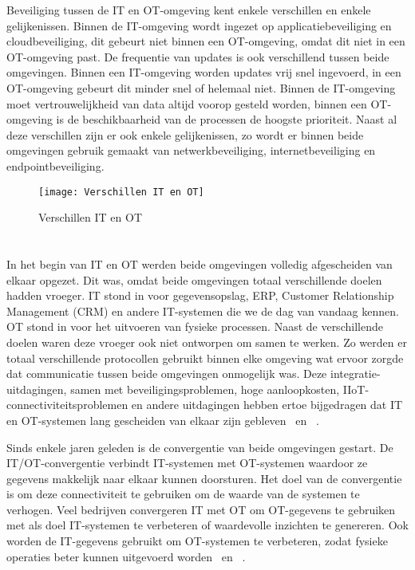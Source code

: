 Beveiliging tussen de IT en OT-omgeving kent enkele verschillen en enkele gelijkenissen. Binnen de IT-omgeving wordt ingezet op applicatiebeveiliging en cloudbeveiliging, dit gebeurt niet binnen een OT-omgeving, omdat dit niet in een OT-omgeving past. De frequentie van updates is ook verschillend tussen beide omgevingen. Binnen een IT-omgeving worden updates vrij snel ingevoerd, in een OT-omgeving gebeurt dit minder snel of helemaal niet. Binnen de IT-omgeving moet vertrouwelijkheid van data altijd voorop gesteld worden, binnen een OT-omgeving is de beschikbaarheid van de processen de hoogste prioriteit. Naast al deze verschillen zijn er ook enkele gelijkenissen, zo wordt er binnen beide omgevingen gebruik gemaakt van netwerkbeveiliging, internetbeveiliging en endpointbeveiliging. 
\begin{figure}
    \texttt{[image: Verschillen IT en OT]}
    \caption{Verschillen IT en OT \label{fig:2.11}} 
\end{figure}
\section{}
\label{sec:Convergentie IT en OT}
In het begin van IT en OT werden beide omgevingen volledig afgescheiden van elkaar opgezet. Dit was, omdat beide omgevingen totaal verschillende doelen hadden vroeger. IT stond in voor gegevensopslag, ERP, Customer Relationship Management (CRM) en andere IT-systemen die we de dag van vandaag kennen. OT stond in voor het uitvoeren van fysieke processen. Naast de verschillende doelen waren deze vroeger ook niet ontworpen om samen te werken. Zo werden er totaal verschillende protocollen gebruikt binnen elke omgeving wat ervoor zorgde dat communicatie tussen beide omgevingen onmogelijk was. Deze integratie-uitdagingen, samen met beveiligingsproblemen, hoge aanloopkosten, IIoT-connectiviteitsproblemen en andere uitdagingen hebben ertoe bijgedragen dat IT en OT-systemen lang gescheiden van elkaar zijn gebleven~\autocite{Remy2020} en ~\autocite{SecureiconTeam2019}.

Sinds enkele jaren geleden is de convergentie van beide omgevingen gestart. De IT/OT-convergentie verbindt IT-systemen met OT-systemen waardoor ze gegevens makkelijk naar elkaar kunnen doorsturen. Het doel van de convergentie is om deze connectiviteit te gebruiken om de waarde van de systemen te verhogen. Veel bedrijven convergeren IT met OT om OT-gegevens te gebruiken met als doel IT-systemen te verbeteren of waardevolle inzichten te genereren. Ook worden de IT-gegevens gebruikt om OT-systemen te verbeteren, zodat fysieke operaties beter kunnen uitgevoerd worden~\autocite{Remy2020} en ~\autocite{SecureiconTeam2019}. 

